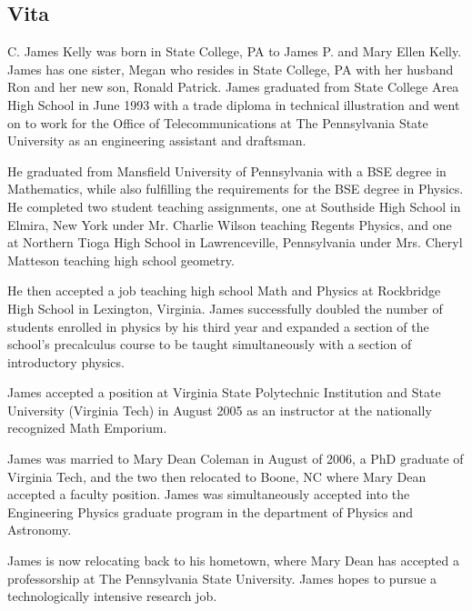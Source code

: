 \begin{center}
\section{Vita}
\end{center}
\thispagestyle{empty}
\linebreak

C. James Kelly was born in State College, PA to James P. and Mary Ellen Kelly. James has one sister, Megan who resides in State College, PA with her husband Ron and her new son, Ronald Patrick. James graduated from State College Area High School in June 1993 with a trade diploma in technical illustration and went on to work for the Office of Telecommunications at The Pennsylvania State University as an engineering assistant and draftsman. 

He graduated from Mansfield University of Pennsylvania with a BSE degree in Mathematics, while also fulfilling the requirements for the BSE degree in Physics. He completed two student teaching assignments, one at Southside High School in Elmira, New York under Mr. Charlie Wilson teaching Regents Physics, and one at Northern Tioga High School in Lawrenceville, Pennsylvania under Mrs. Cheryl Matteson teaching high school geometry. 

He then accepted a job teaching high school Math and Physics at Rockbridge High School in Lexington, Virginia. James successfully doubled the number of students enrolled in physics by his third year  and expanded a section of the school's precalculus course to be taught simultaneously with a section of introductory physics.

James accepted a position at Virginia State Polytechnic Institution and State University (Virginia Tech) in August 2005 as an instructor at the nationally recognized Math Emporium. 

James was married to Mary Dean Coleman in August of 2006, a PhD graduate of Virginia Tech, and the two then relocated to Boone, NC where Mary Dean accepted a faculty position. James was simultaneously accepted into the Engineering Physics graduate program in the department of Physics and Astronomy.

James is now relocating back to his hometown, where Mary Dean has accepted a professorship at The Pennsylvania State University. James hopes to pursue a technologically intensive research job. 
